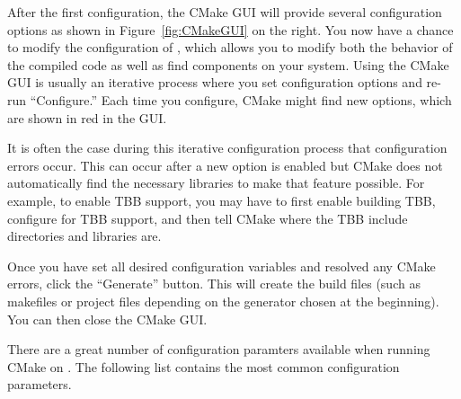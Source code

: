 After the first configuration, the CMake GUI will provide several configuration options as shown in Figure~\ref{fig:CMakeGUI} on the right.
You now have a chance to modify the configuration of \VTKm, which allows you to modify both the behavior of the compiled \VTKm code as well as find components on your system.
Using the CMake GUI is usually an iterative process where you set configuration options and re-run ``Configure.''
Each time you configure, CMake might find new options, which are shown in red in the GUI.

It is often the case during this iterative configuration process that configuration errors occur.
This can occur after a new option is enabled but CMake does not automatically find the necessary libraries to make that feature possible.
For example, to enable TBB support, you may have to first enable building TBB, configure for TBB support, and then tell CMake where the TBB include directories and libraries are.

Once you have set all desired configuration variables and resolved any CMake errors, click the ``Generate'' button. This will create the build files (such as makefiles or project files depending on the generator chosen at the beginning). You can then close the CMake GUI.

There are a great number of configuration paramters available when running CMake on \VTKm.
The following list contains the most common configuration parameters.

